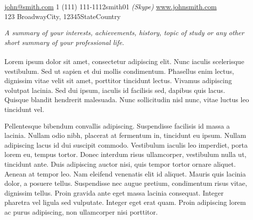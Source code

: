 \documentclass[10pt,a4paper]{article} %
\begin{document}
 



\noindent\href{mailto:john@smith.com}{john@smith.com}\bull %
\textsmaller{+}1 (111) 111-1112\bull smith01 \textit{(Skype)}\bull %
\href{http://www.johnsmith.com}{www.johnsmith.com}\\ %
123 Broadway\bull City, 12345\bull State\bull Country %

\spacedhrule{0.9em}{-0.4em} %



\vspace{-1.3em} %

\begin{multicols}{2}  %
\noindent \textit{A summary of your interests, achievements, history, topic of
study or any other short summary of your professional life.}\\\\
Lorem ipsum dolor sit amet, consectetur adipiscing elit. Nunc iaculis
scelerisque vestibulum. Sed ut sapien et dui mollis condimentum. Phasellus enim
lectus, dignissim vitae velit sit amet, porttitor tincidunt lectus. Vivamus
adipiscing volutpat lacinia. Sed dui ipsum, iaculis id facilisis sed, dapibus
quis lacus. Quisque blandit hendrerit malesuada. Nunc sollicitudin nisl nunc,
vitae luctus leo tincidunt vel.

Pellentesque bibendum convallis adipiscing. Suspendisse facilisis id massa a
lacinia. Nullam odio nibh, placerat at fermentum in, tincidunt eu ipsum. Nullam
adipiscing lacus id dui suscipit commodo. Vestibulum iaculis leo imperdiet,
porta lorem eu, tempus tortor. Donec interdum risus ullamcorper, vestibulum
nulla ut, tincidunt ante. Duis adipiscing auctor nisi, quis tempor tortor
ornare aliquet. Aenean at tempor leo. Nam eleifend venenatis elit id aliquet.
Mauris quis lacinia dolor, a posuere tellus. Suspendisse nec augue pretium,
condimentum risus vitae, dignissim tellus. Proin gravida ante eget massa
lacinia consequat. Integer pharetra vel ligula sed vulputate. Integer eget erat
quam. Proin adipiscing lorem ac purus adipiscing, non ullamcorper nisi
porttitor. 
\end{multicols}
\end{document}
